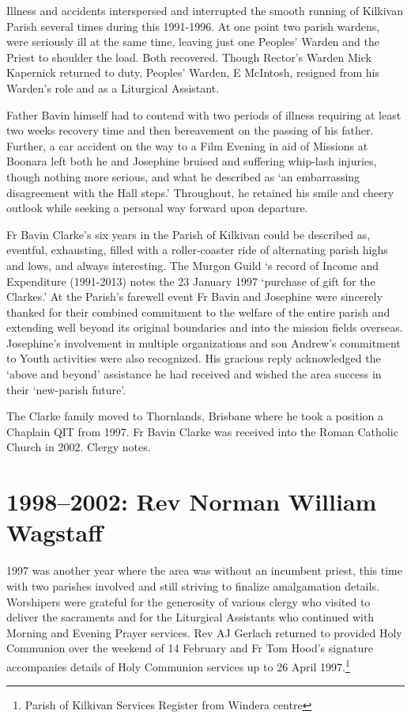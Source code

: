 Illness and accidents interspersed and interrupted the smooth running of Kilkivan Parish several times during this 1991-1996. At one point two parish wardens, were seriously ill at the same time, leaving just one Peoples' Warden and the Priest to shoulder the load. Both recovered. Though Rector's Warden Mick Kapernick returned to duty, Peoples' Warden, E McIntosh, resigned from his Warden's role and as a Liturgical Assistant.

Father Bavin himself had to contend with two periods of illness requiring at least two weeks recovery time and then bereavement on the passing of his father. Further, a car accident on the way to a Film Evening in aid of Missions at Boonara left both he and Josephine bruised and suffering whip-lash injuries, though nothing more serious, and what he described as `an embarrassing disagreement with the Hall steps.' Throughout, he retained his smile and cheery outlook while seeking a personal way forward upon departure.

Fr Bavin Clarke's six years in the Parish of Kilkivan could be described as, eventful, exhausting, filled with a roller-coaster ride of alternating parish highs and lows, and always interesting. The Murgon Guild `s record of Income and Expenditure (1991-2013) notes the 23 January 1997 `purchase of gift for the Clarkes.' At the Parish's farewell event Fr Bavin and Josephine were sincerely thanked for their combined commitment to the welfare of the entire parish and extending well beyond its original boundaries and into the mission fields overseas. Josephine's involvement in multiple organizations and son Andrew's commitment to Youth activities were also recognized. His gracious reply acknowledged the `above and beyond' assistance he had received and wished the area success in their `new-parish future'.

The Clarke family moved to Thornlands, Brisbane where he took a position a Chaplain QIT from 1997. Fr Bavin Clarke was received into the Roman Catholic Church in 2002. Clergy notes.

\hypertarget{rev-norman-william-wagstaff}{%
\section{1998--2002: Rev Norman William Wagstaff}\label{rev-norman-william-wagstaff}}

1997 was another year where the area was without an incumbent priest, this time with two parishes involved and still striving to finalize amalgamation details. Worshipers were grateful for the generosity of various clergy who visited to deliver the sacraments and for the Liturgical Assistants who continued with Morning and Evening Prayer services. Rev AJ Gerlach returned to provided Holy Communion over the weekend of 14 February and Fr Tom Hood's signature accompanies details of Holy Communion services up to 26 April 1997.\footnote{Parish of Kilkivan Services Register from Windera centre}

